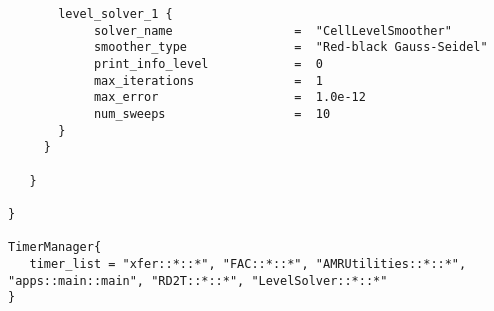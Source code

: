 \documentclass[12pt]{article}
\begin{document}
\begin{verbatim}
       level_solver_1 {
            solver_name                 =  "CellLevelSmoother"
            smoother_type               =  "Red-black Gauss-Seidel"
            print_info_level            =  0
            max_iterations              =  1
            max_error                   =  1.0e-12
            num_sweeps                  =  10
       }
     }
        
   }

}

TimerManager{
   timer_list = "xfer::*::*", "FAC::*::*", "AMRUtilities::*::*", "apps::main::main", "RD2T::*::*", "LevelSolver::*::*"
}

\end{verbatim}
\end{document}

